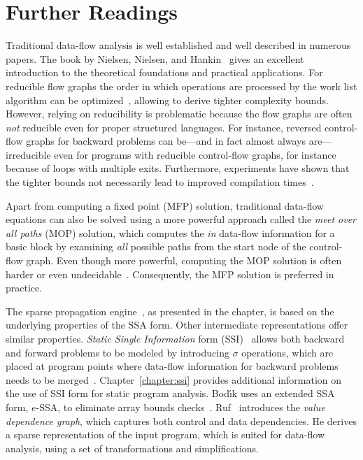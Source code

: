 \section{Further Readings}
\label{novillo:sec:further_reading}

Traditional data-flow analysis is well established and well described in
numerous papers. The book by Nielsen, Nielsen, and
Hankin~\cite{novillo:bib:NNH99} gives an excellent introduction to the
theoretical foundations and practical applications.
For reducible flow graphs the order in which operations are processed by the
work list algorithm can be
optimized~\cite{novillo:bib:HU73,novillo:bib:KU76,novillo:bib:NNH99}, allowing
to derive tighter complexity bounds. However, relying on reducibility is
problematic because the flow graphs are often \emph{not} reducible even for
proper structured languages. For instance, reversed control-flow graphs for backward
problems can be---and in fact almost always are---irreducible even for programs
with reducible control-flow graphs, for instance because of loops with multiple 
exits.  Furthermore, experiments have shown that the
tighter bounds not necessarily lead to improved compilation
times~\cite{novillo:bib:CTK06}.

Apart from computing a fixed point (MFP) solution, traditional data-flow
equations can also
be solved using a more powerful approach called the \emph{meet over all paths}
(MOP) solution, which computes the \emph{in} data-flow information for a basic
block by examining \emph{all} possible paths from the start node of the control-flow graph. Even though more powerful, computing the MOP solution is often
harder or even undecidable~\cite{novillo:bib:NNH99}. Consequently,
the MFP solution is preferred in practice.

The sparse propagation engine~\cite{novillo:bib:N05,bib:wegman.ea-91}, as
presented in the chapter, is based on the
underlying properties of the SSA form. Other intermediate representations offer
similar properties. \emph{Static Single Information} form
(SSI)~\cite{novillo:bib:S05} allows both backward and forward problems to be
modeled by introducing $\sigma$ operations, which are placed at program points
where data-flow information for backward problems needs to be
merged~\cite{novillo:bib:S04}. Chapter~\ref{chapter:ssi} provides additional
information on the use of SSI form for static program analysis.
Bod\'{\i}k uses an extended SSA form, $e$-SSA,
to eliminate array bounds checks~\cite{novillo:bib:BGV00}.
Ruf~\cite{novillo:bib:R95} introduces the \emph{value dependence graph}, which
captures both control and data dependencies. He derives a sparse representation
of the input program, which is suited for data-flow analysis, using a set of
transformations and simplifications.

